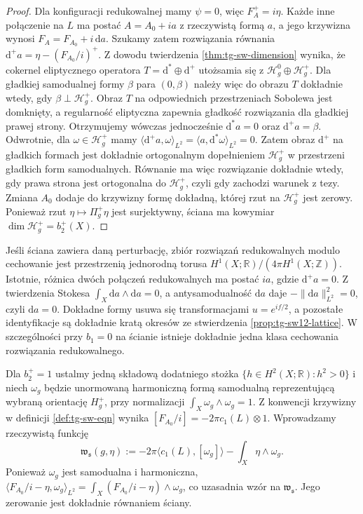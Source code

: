 \begin{proof}
Dla konfiguracji redukowalnej mamy $\psi=0$, więc
$F_A^+=i\eta$. Każde inne połączenie na $L$ ma postać
$A=A_0+ia$ z rzeczywistą formą $a$, a jego krzywizna
wynosi $F_A=F_{A_0}+i\,\mathrm da$.
Szukamy zatem rozwiązania równania
$\mathrm d^+a=\eta-(F_{A_0}/i)^+$.
Z dowodu twierdzenia \ref{thm:tg-sw-dimension}
wynika, że cokernel eliptycznego operatora
$T=\mathrm d^*\oplus\mathrm d^+$ utożsamia się
z $\mathcal H_g^0\oplus\mathcal H_g^+$.
Dla gładkiej samodualnej formy $\beta$ para
$(0,\beta)$ należy więc do obrazu $T$ dokładnie
wtedy, gdy $\beta\perp\mathcal H_g^+$.
Obraz $T$ na odpowiednich przestrzeniach Sobolewa
jest domknięty, a regularność eliptyczna zapewnia
gładkość rozwiązania dla gładkiej prawej strony.
Otrzymujemy wówczas jednocześnie
$\mathrm d^*a=0$ oraz $\mathrm d^+a=\beta$.
Odwrotnie, dla $\omega\in\mathcal H_g^+$ mamy
$\langle\mathrm d^+a,\omega\rangle_{L^2}
=\langle a,\mathrm d^*\omega\rangle_{L^2}=0$.
Zatem obraz $\mathrm d^+$ na gładkich formach
jest dokładnie ortogonalnym dopełnieniem
$\mathcal H_g^+$ w przestrzeni gładkich form
samodualnych.
Równanie ma więc rozwiązanie dokładnie wtedy, gdy
prawa strona jest ortogonalna do $\mathcal H_g^+$,
czyli gdy zachodzi warunek z tezy.
Zmiana $A_0$ dodaje do krzywizny formę dokładną,
której rzut na $\mathcal H_g^+$ jest zerowy.
Ponieważ rzut $\eta\mapsto\Pi_g^+\eta$ jest surjektywny,
ściana ma kowymiar $\dim\mathcal H_g^+=b_2^+(X)$.
\end{proof}

Jeśli ściana zawiera daną perturbację, zbiór
rozwiązań redukowalnych modulo cechowanie jest
przestrzenią jednorodną torusa
$H^1(X;\mathbb R)/(4\pi H^1(X;\mathbb Z))$.
Istotnie, różnica dwóch połączeń redukowalnych
ma postać $ia$, gdzie $\mathrm d^+a=0$.
Z twierdzenia Stokesa
$\int_X\mathrm da\wedge\mathrm da=0$,
a antysamodualność $\mathrm da$ daje
$-\|\mathrm da\|_{L^2}^2=0$, czyli $\mathrm da=0$.
Dokładne formy usuwa się transformacjami
$u=e^{if/2}$, a pozostałe identyfikacje
są dokładnie kratą okresów ze
stwierdzenia \ref{prop:tg-sw12-lattice}.
W szczególności przy $b_1=0$ na ścianie
istnieje dokładnie jedna klasa cechowania
rozwiązania redukowalnego.

Dla $b_2^+=1$ ustalmy jedną składową dodatniego stożka
$\{h\in H^2(X;\mathbb R):h^2>0\}$ i niech
$\omega_g$ będzie unormowaną harmoniczną formą
samodualną reprezentującą wybraną orientację $H_g^+$,
przy normalizacji $\int_X\omega_g\wedge\omega_g=1$.
Z konwencji krzywizny w definicji
\ref{def:tg-sw-eqn} wynika
$[F_{A_0}/i]=-2\pi c_1(L)\otimes1$.
Wprowadzamy rzeczywistą funkcję
\[
\mathfrak w_{\mathfrak s}(g,\eta)
:=-2\pi\langle c_1(L),[\omega_g]\rangle
-\int_X\eta\wedge\omega_g.
\]
Ponieważ $\omega_g$ jest samodualna i harmoniczna,
$\langle F_{A_0}/i-\eta,\omega_g\rangle_{L^2}
=\int_X(F_{A_0}/i-\eta)\wedge\omega_g$,
co uzasadnia wzór na $\mathfrak w_{\mathfrak s}$.
Jego zerowanie jest dokładnie równaniem ściany.


